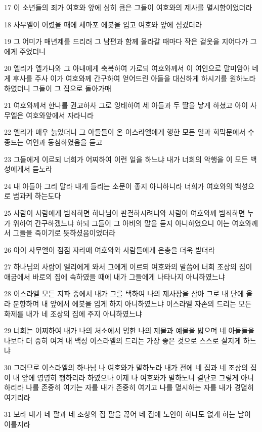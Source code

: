 \par 17 이 소년들의 죄가 여호와 앞에 심히 큼은 그들이 여호와의 제사를 멸시함이었더라
\par 18 사무엘이 어렸을 때에 세마포 에봇을 입고 여호와 앞에 섬겼더라
\par 19 그 어미가 매년제를 드리러 그 남편과 함께 올라갈 때마다 작은 겉옷을 지어다가 그에게 주었더니
\par 20 엘리가 엘가나와 그 아내에게 축복하여 가로되 여호와께서 이 여인으로 말미암아 네게 후사를 주사 이가 여호와께 간구하여 얻어드린 아들을 대신하게 하시기를 원하노라 하였더니 그들이 그 집으로 돌아가매
\par 21 여호와께서 한나를 권고하사 그로 잉태하여 세 아들과 두 딸을 낳게 하셨고 아이 사무엘은 여호와앞에서 자라니라
\par 22 엘리가 매우 늙었더니 그 아들들이 온 이스라엘에게 행한 모든 일과 회막문에서 수종드는 여인과 동침하였음을 듣고
\par 23 그들에게 이르되 너희가 어찌하여 이런 일을 하느냐 내가 너희의 악행을 이 모든 백성에게서 듣노라
\par 24 내 아들아 그리 말라 내게 들리는 소문이 좋지 아니하니라 너희가 여호와의 백성으로 범과케 하는도다
\par 25 사람이 사람에게 범죄하면 하나님이 판결하시려니와 사람이 여호와께 범죄하면 누가 위하여 간구하겠느냐 하되 그들이 그 아비의 말을 듣지 아니하였으니 이는 여호와께서 그들을 죽이기로 뜻하셨음이었더라
\par 26 아이 사무엘이 점점 자라매 여호와와 사람들에게 은총을 더욱 받더라
\par 27 하나님의 사람이 엘리에게 와서 그에게 이르되 여호와의 말씀에 너희 조상의 집이 애굽에서 바로의 집에 속하였을 때에 내가 그들에게 나타나지 아니하였느냐
\par 28 이스라엘 모든 지파 중에서 내가 그를 택하여 나의 제사장을 삼아 그로 내 단에 올라 분향하며 내 앞에서 에봇을 입게 하지 아니하였느냐 이스라엘 자손의 드리는 모든 화제를 내가 네 조상의 집에 주지 아니하였느냐
\par 29 너희는 어찌하여 내가 나의 처소에서 명한 나의 제물과 예물을 밟으며 네 아들들을 나보다 더 중히 여겨 내 백성 이스라엘의 드리는 가장 좋은 것으로 스스로 살지게 하느냐
\par 30 그러므로 이스라엘의 하나님 나 여호와가 말하노라 내가 전에 네 집과 네 조상의 집이 내 앞에 영영히 행하리라 하였으나 이제 나 여호와가 말하노니 결단코 그렇게 아니하리라 나를 존중히 여기는 자를 내가 존중히 여기고 나를 멸시하는 자를 내가 경멸히 여기리라
\par 31 보라 내가 네 팔과 네 조상의 집 팔을 끊어 네 집에 노인이 하나도 없게 하는 날이 이를지라
